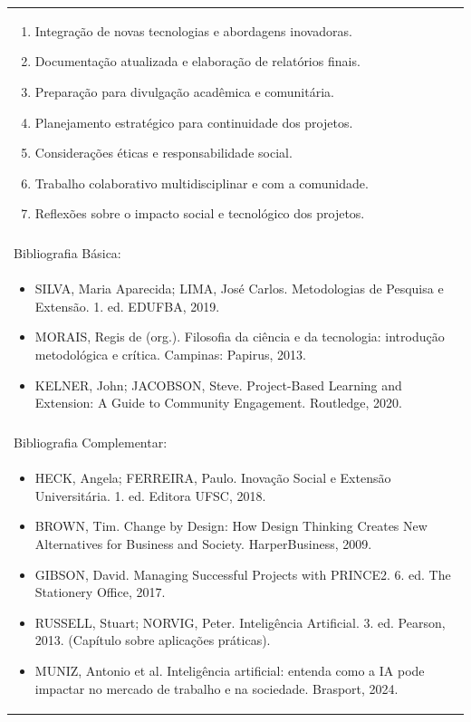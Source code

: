 \documentclass[11pt]{article}
\begin{document}
\begin{center}
\begin{longtable}{|p{4cm}|p{4cm}|p{4cm}|p{4cm}|}
{\begin{enumerate}
\item Integração de novas tecnologias e abordagens inovadoras.
\item Documentação atualizada e elaboração de relatórios finais.
\item Preparação para divulgação acadêmica e comunitária.
\item Planejamento estratégico para continuidade dos projetos.
\item Considerações éticas e responsabilidade social.
\item Trabalho colaborativo multidisciplinar e com a comunidade.
\item Reflexões sobre o impacto social e tecnológico dos projetos.\end{enumerate}}\\
\multicolumn{4}{|p{16cm}|}{}\\
\hline
\multicolumn{4}{|p{16cm}|}{Bibliografia Básica:}\\
\multicolumn{4}{|p{16cm}|}{%
\begin{itemize}\item SILVA, Maria Aparecida; LIMA, José Carlos. Metodologias de Pesquisa e Extensão. 1. ed. EDUFBA, 2019.
\item MORAIS, Regis de (org.). Filosofia da ciência e da tecnologia: introdução metodológica e crítica. Campinas: Papirus, 2013.
\item KELNER, John; JACOBSON, Steve. Project-Based Learning and Extension: A Guide to Community Engagement. Routledge, 2020.\end{itemize}}\\
\multicolumn{4}{|p{16cm}|}{}\\
\hline
\multicolumn{4}{|p{16cm}|}{Bibliografia Complementar:}\\
\multicolumn{4}{|p{16cm}|}{%
\begin{itemize}\item HECK, Angela; FERREIRA, Paulo. Inovação Social e Extensão Universitária. 1. ed. Editora UFSC, 2018.
\item BROWN, Tim. Change by Design: How Design Thinking Creates New Alternatives for Business and Society. HarperBusiness, 2009.
\item GIBSON, David. Managing Successful Projects with PRINCE2. 6. ed. The Stationery Office, 2017.
\item RUSSELL, Stuart; NORVIG, Peter. Inteligência Artificial. 3. ed. Pearson, 2013. (Capítulo sobre aplicações práticas).
\item MUNIZ, Antonio et al. Inteligência artificial: entenda como a IA pode impactar no mercado de trabalho e na sociedade. Brasport, 2024.\end{itemize}}\\
\hline
\end{longtable}
\end{center}

\clearpage
\end{document}
